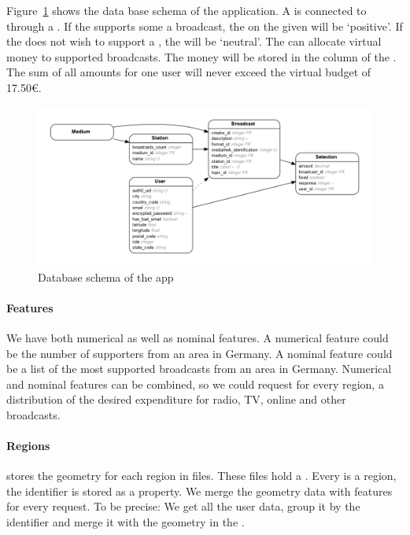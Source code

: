 Figure~\ref{fig:data:rundfunk} shows the data base schema of the application.
A  is connected to  through a .
If the  supports some a broadcast, the  on the given  will be `positive'.
If the  does not wish to support a , the  will be `neutral'.
The  can allocate virtual money to supported broadcasts.
The money will be stored in the column  of the .
The sum of all amounts for one user will never exceed the virtual budget of 17.50€.

\begin{figure}[h!]
  \centering
  \includegraphics[width=\textwidth]{images/er}
  \caption{Database schema of the \rufu{} app}\label{fig:data:rundfunk}
\end{figure}

\paragraph{Features}
We have both numerical as well as nominal features.
A numerical feature could be the number of supporters from an area in Germany.
A nominal feature could be a list of the most supported broadcasts from an area in Germany.
Numerical and nominal features can be combined, so we could request for every region, a distribution of the desired expenditure for radio, TV, online and other broadcasts.

\paragraph{Regions}
\rufu{} stores the geometry for each region in  files.
These files hold a .
Every  is a region, the identifier is stored as a property.
We merge the geometry data with features for every request.
To be precise: We get all the user data, group it by the identifier  and merge it with the geometry in the .

